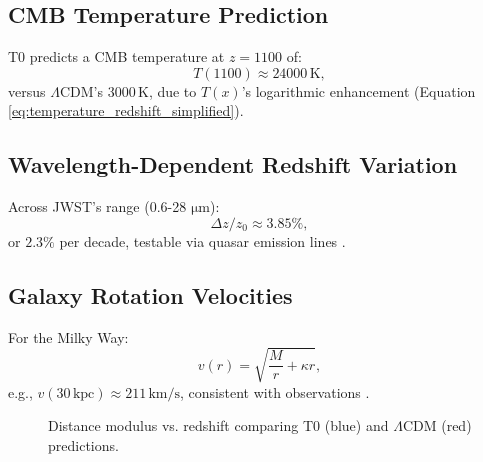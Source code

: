 \documentclass[twocolumn,aps,prl]{revtex4-2}
\newcommand{\Tfield}{T(x)}
\newcommand{\LCDM}{\Lambda\text{CDM}}
\begin{document}
	\subsection{CMB Temperature Prediction}
	\label{subsec:cmb_temp_prediction}
	
	T0 predicts a CMB temperature at \(z = 1100\) of:
	\begin{equation}
		T(1100) \approx 24000 \, \text{K},
		\label{eq:cmb_temp_t0}
	\end{equation}
	versus \(\LCDM\)'s \(3000 \, \text{K}\), due to \(\Tfield\)'s logarithmic enhancement (Equation \ref{eq:temperature_redshift_simplified}).
	
	\subsection{Wavelength-Dependent Redshift Variation}
	\label{subsec:wavelength_redshift_prediction}
	
	Across JWST's range (0.6-28 \(\si{\micro\meter}\)):
	\begin{equation}
		\Delta z / z_0 \approx 3.85\%,
		\label{eq:wavelength_variation}
	\end{equation}
	or \(2.3\%\) per decade, testable via quasar emission lines \cite{pascher_params_2025}.
	
	\subsection{Galaxy Rotation Velocities}
	\label{subsec:rotation_velocity_prediction}
	
	For the Milky Way:
	\begin{equation}
		v(r) = \sqrt{\frac{M}{r} + \kappa r},
		\label{eq:rotation_velocity_repeat}
	\end{equation}
	e.g., \(v(30 \, \text{kpc}) \approx 211 \, \text{km/s}\), consistent with observations \cite{McGaugh2016}.
	
	\begin{figure}[ht]
		\centering
		\caption{Distance modulus vs. redshift comparing T0 (blue) and \(\LCDM\) (red) predictions.}
		\label{fig:distance_modulus}
	\end{figure}
	
\end{document}
